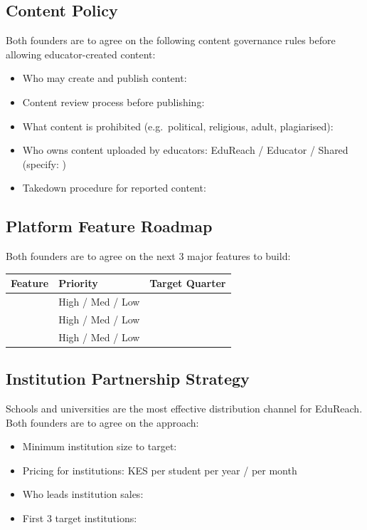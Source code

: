 \documentclass[12pt,a4paper]{article}
\newcommand{\blank}[1][5.5cm]{\underline{\hspace{#1}}}
\begin{document}
\subsection{Content Policy}

Both founders are to agree on the following content governance rules before allowing educator-created content:

\begin{itemize}
  \item Who may create and publish content: \blank[6cm]
  \item Content review process before publishing: \blank[6cm]
  \item What content is prohibited (e.g.\ political, religious, adult, plagiarised): \blank[6cm]
  \item Who owns content uploaded by educators: \quad EduReach \;/\; Educator \;/\; Shared (specify: \blank[3cm])
  \item Takedown procedure for reported content: \blank[6cm]
\end{itemize}

\subsection{Platform Feature Roadmap}

Both founders are to agree on the next 3 major features to build:

\begin{tabularx}{\linewidth}{L{5cm} C{3cm} X}
  \toprule
  \textbf{Feature} & \textbf{Priority} & \textbf{Target Quarter} \\
  \midrule
  \blank[4.5cm] & High / Med / Low & \blank[4cm] \\[0.4em]
  \blank[4.5cm] & High / Med / Low & \blank[4cm] \\[0.4em]
  \blank[4.5cm] & High / Med / Low & \blank[4cm] \\
  \bottomrule
\end{tabularx}

\subsection{Institution Partnership Strategy}

Schools and universities are the most effective distribution channel for EduReach. Both founders are to agree on the approach:

\begin{itemize}
  \item Minimum institution size to target: \blank[5cm]
  \item Pricing for institutions: KES \blank[3cm] per student per year / per month
  \item Who leads institution sales: \blank[5cm]
  \item First 3 target institutions: \blank[8cm]
\end{itemize}
\end{document}
